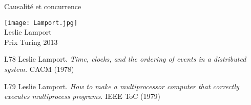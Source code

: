 
\begingroup

\begin{frame}{Causalité et concurrence}
  \vfill
  \begin{center}
    \texttt{[image: Lamport.jpg]}\\
    Leslie Lamport\\
    Prix Turing 2013
  \end{center}
  \vfill
  \begin{citing}
  \item[L78] Leslie Lamport. \textit{Time, clocks, and the ordering of events in a distributed system.} CACM (1978)
  \item[L79] Leslie Lamport. \textit{How to make a multiprocessor computer that correctly executes multiprocess programs.} IEEE ToC (1979)
  \end{citing}
\end{frame}

\endgroup
\endinput
